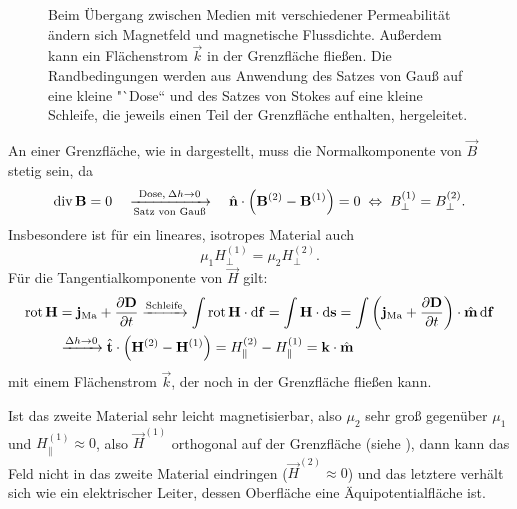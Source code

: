\begin{figure}[ht]
	\centering
	\tfigGrenzflaecheMagnetic
	\caption{Beim Übergang zwischen Medien mit verschiedener Permeabilität ändern sich Magnetfeld und magnetische Flussdichte. Außerdem kann ein Flächenstrom $\vec k$ in der Grenzfläche fließen.
		Die Randbedingungen werden aus Anwendung des Satzes von Gauß auf eine kleine "`Dose`` und des Satzes von Stokes auf eine kleine Schleife, die jeweils einen Teil der Grenzfläche enthalten, hergeleitet. }
	\label{fig:grenzflaeche_magnetic}
\end{figure}

An einer Grenzfläche, wie in  dargestellt, muss die Normalkomponente von $\vec {B}$ stetig sein, da
\begin{equation*}
	\operatorname{div} \mathbf{B}=0\quad\xrightarrow[\text{Satz von Gau\ss }]{\text{Dose},\: \Delta  h\rightarrow 0}\quad\hat{\mathbf{n}}\cdot \left(\mathbf{B}^{\left(2\right)}-\mathbf{B}^{\left(1\right)}\right)=0\;\Leftrightarrow\; B_{\perp }^{\left(1\right)}=B_{\perp }^{\left(2\right)}.
\end{equation*}
Insbesondere ist für ein lineares, isotropes Material auch
\begin{equation*}
	\mu _{1}H_{\perp }^{\left(1\right)}=\mu _{2}H_{\perp }^{\left(2\right)}.
\end{equation*}
Für die Tangentialkomponente von $\vec {H}$ gilt:
\begin{align*}
	\operatorname{rot} \mathbf{H} & =\mathbf{j}_{\mathrm{Ma}}+\frac{\partial \mathbf{D}}{\partial t}\xrightarrow{\text{Schleife}} \int \operatorname{rot} \mathbf{H}\cdot \mathop{}\!\mathrm{d} \mathbf{f}=\int \mathbf{H}\cdot \mathop{}\!\mathrm{d} \mathbf{s}=\int \left(\mathbf{j}_{\mathrm{Ma}}+\frac{\partial \mathbf{D}}{\partial t}\right)\cdot \hat{\mathbf{m}}\mathop{}\!\mathrm{d} \mathbf{f} \\
	              & \xrightarrow{\Delta  h\rightarrow 0}\hat{\mathbf{t}}\cdot \left(\mathbf{H}^{\left(2\right)}-\mathbf{H}^{\left(1\right)}\right)=H_{\parallel }^{\left(2\right)}-H_{\parallel }^{\left(1\right)}=\mathbf{k}\cdot \hat{\mathbf{m}}
\end{align*}
mit einem Flächenstrom $\vec {k}$, der noch in der Grenzfläche fließen kann.

Ist das zweite Material sehr leicht magnetisierbar, also $\mu _{2}$ sehr groß gegenüber $\mu _{1}$ und $H^{\left(1\right)}_\parallel\approx 0$, also $\vec {H}^{\left(1\right)}$ orthogonal auf der Grenzfläche (siehe ), dann kann das Feld nicht in das zweite Material eindringen ($\vec H^{(2)}\approx 0$) und das letztere verhält sich wie ein elektrischer Leiter, dessen Oberfläche eine Äquipotentialfläche ist.

